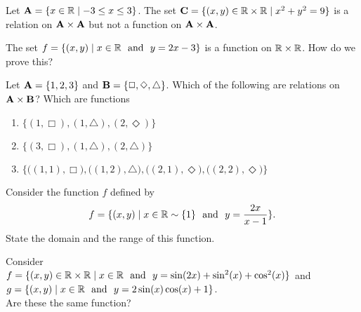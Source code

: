 \begin{expl}
Let $\mathbf A = \{ x \in \mathbb R  \mid  - 3 \leq x \leq 3 \}$. The set $\mathbf C = \{ (x,y) \in \mathbb R \times \mathbb R  \mid  x^2 + y^2 = 9 \}$ is a relation on $\mathbf A \times \mathbf A$ but not a function on $\mathbf A \times \mathbf A$.
\begin{annotation}
\end{annotation}
\end{expl}

\begin{expl}
\label{fnproof}
The set $f = \{ (x,y)  \mid  x \in \mathbb R \ \mbox{ and } \  y = 2x-3 \}$ is a function on $\mathbb R \times \mathbb R$. How do we prove this?
\end{expl}

\begin{prb}
Let $\mathbf A = \{ 1, 2, 3 \}$ and $\mathbf B = \{ \Box, \Diamond, \triangle \}$. Which of the following are relations on $\mathbf A \times \mathbf B$?  Which are functions
\begin{enumerate}
\item $\{ (1, \Box) , (1, \triangle), (2, \Diamond) \}$
\item $\{ (3, \Box) , (1, \triangle), (2, \triangle) \}$
\item  $\{ \big( (1,1) , \Box \big) , \big( (1,2) , \triangle), \big( (2,1) , \Diamond \big), \big( (2,2) , \Diamond \big) \}$
\end{enumerate}
\end{prb}

\begin{prb}
Consider the function $f$ defined by $$  f = \{ (x,y)  \mid  x \in \mathbb R \sim \{1\} \ \mbox{ and } \ y = \frac{2x}{x-1} \}.$$ State the domain and the range of this function.
\end{prb}

\begin{prb}
Consider \\
$f = \{ (x,y) \in \mathbb R \times \mathbb R  \mid  x \in \mathbb R \ \mbox{ and } \ y = \sin(2x) + \sin^2(x) + \cos^2(x) \}$ and\\
$g = \{ (x,y)  \mid  x \in \R \ \mbox{ and } \ y = 2\sin(x)\cos(x) + 1 \}$.\\
Are these the same function?
\end{prb}

